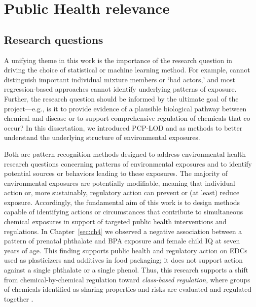 \section{Public Health relevance}\label{sec:ph}

\subsection{Research questions}\label{sec:question}
A unifying theme in this work is the importance of the research question in driving the choice of statistical or machine learning method. For example, \bnmf cannot distinguish important individual mixture members or `bad actors,' and most regression-based approaches cannot identify underlying patterns of exposure. Further, the research question should be informed by the ultimate goal of the project---e.g., is it to provide evidence of a plausible biological pathway between chemical and disease or to support comprehensive regulation of chemicals that co-occur? In this dissertation, we introduced PCP-LOD and \bnmf as methods to better understand the underlying structure of environmental exposures.

Both are pattern recognition methods designed to address environmental health research questions concerning patterns of environmental exposures and to identify potential sources or behaviors leading to these exposures. The majority of environmental exposures are potentially modifiable, meaning that individual action or, more sustainably, regulatory action can prevent or (at least) reduce exposure. Accordingly, the fundamental aim of this work is to design methods capable of identifying actions or circumstances that contribute to simultaneous chemical exposures in support of targeted public health interventions and regulations. In Chapter~\ref{sec:ch4} we observed a negative association between a pattern of prenatal phthalate and BPA exposure and female child IQ at seven years of age. This finding supports public health and regulatory action on EDCs used as plasticizers and additives in food packaging; it does not support action against a single phthalate or a single phenol. Thus, this research supports a shift from chemical-by-chemical regulation toward \textit{class-based regulation}, where groups of chemicals identified as sharing properties and risks are evaluated and regulated together \citep{cordner2016can}.

